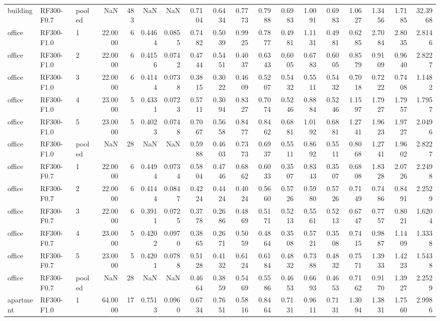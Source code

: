 \begin{tabular}{lllrrrrrrrrrrrrrrr}
building & RF300-F0.7 & pooled & NaN & 483 & NaN & NaN & 0.7104 & 0.6434 & 0.7773 & 0.7988 & 0.6983 & 1.0091 & 0.6983 & 1.0627 & 1.3456 & 1.7185 & 32.3968 \\
office & RF300-F1.0 & 1 & 22.0000 & 6 & 0.4464 & 0.0855 & 0.7482 & 0.5039 & 0.9925 & 0.7877 & 0.4981 & 1.1131 & 0.4981 & 0.6285 & 2.7084 & 2.8035 & 2.8146 \\
office & RF300-F1.0 & 2 & 22.0000 & 6 & 0.4156 & 0.0742 & 0.4744 & 0.5451 & 0.4037 & 0.6343 & 0.6005 & 0.6783 & 0.6005 & 0.8579 & 0.9109 & 0.9640 & 2.8227 \\
office & RF300-F1.0 & 3 & 22.0000 & 6 & 0.4144 & 0.0738 & 0.3815 & 0.3022 & 0.4609 & 0.5207 & 0.5432 & 0.5511 & 0.5432 & 0.7018 & 0.7222 & 0.7408 & 1.1482 \\
office & RF300-F1.0 & 4 & 23.0000 & 5 & 0.4331 & 0.0723 & 0.5711 & 0.3094 & 0.8327 & 0.7074 & 0.5246 & 0.8884 & 0.5246 & 1.1597 & 1.7927 & 1.7957 & 1.7957 \\
office & RF300-F1.0 & 5 & 23.0000 & 5 & 0.4023 & 0.0748 & 0.7067 & 0.5658 & 0.8477 & 0.8462 & 0.6881 & 1.0192 & 0.6881 & 1.2741 & 1.9623 & 1.9727 & 2.0496 \\
office & RF300-F1.0 & pooled & NaN & 28 & NaN & NaN & 0.5988 & 0.4603 & 0.7373 & 0.6937 & 0.5511 & 0.8692 & 0.5511 & 0.8068 & 1.2741 & 1.9602 & 2.8227 \\
office & RF300-F0.7 & 1 & 22.0000 & 6 & 0.4494 & 0.0734 & 0.5804 & 0.4746 & 0.6862 & 0.6033 & 0.3507 & 0.8343 & 0.3507 & 0.6808 & 1.8328 & 2.0726 & 2.2498 \\
office & RF300-F0.7 & 2 & 22.0000 & 6 & 0.4144 & 0.0847 & 0.4224 & 0.4424 & 0.4024 & 0.5660 & 0.5726 & 0.5980 & 0.5726 & 0.7149 & 0.7486 & 0.8491 & 2.2529 \\
office & RF300-F0.7 & 3 & 22.0000 & 6 & 0.3911 & 0.0725 & 0.3778 & 0.2686 & 0.4869 & 0.5171 & 0.5213 & 0.5561 & 0.5213 & 0.6747 & 0.7757 & 0.8021 & 1.6204 \\
office & RF300-F0.7 & 4 & 23.0000 & 5 & 0.4202 & 0.0970 & 0.3865 & 0.2671 & 0.5059 & 0.4864 & 0.3508 & 0.5721 & 0.3508 & 0.7415 & 0.9887 & 1.1409 & 1.3338 \\
office & RF300-F0.7 & 5 & 23.0000 & 5 & 0.4201 & 0.0788 & 0.5128 & 0.4132 & 0.6124 & 0.6184 & 0.4832 & 0.7388 & 0.4832 & 0.7571 & 1.3933 & 1.4223 & 1.5438 \\
office & RF300-F0.7 & pooled & NaN & 28 & NaN & NaN & 0.4664 & 0.3859 & 0.5469 & 0.5586 & 0.4653 & 0.6693 & 0.4653 & 0.7162 & 0.9170 & 1.3927 & 2.2529 \\
apartment & RF300-F1.0 & 1 & 64.0000 & 17 & 0.7513 & 0.0960 & 0.6734 & 0.7651 & 0.5816 & 0.8464 & 0.7131 & 0.9611 & 0.7131 & 1.3094 & 1.3831 & 1.7560 & 2.9986 \\

\end{tabular}
